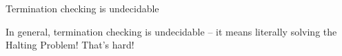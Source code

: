 \documentclass{beamer}
\begin{document}
\begin{frame}{Termination checking is undecidable}

In general, termination checking is undecidable -- it means literally solving the Halting Problem! That's hard!

\vspace{2em}

\end{frame}
\end{document}
